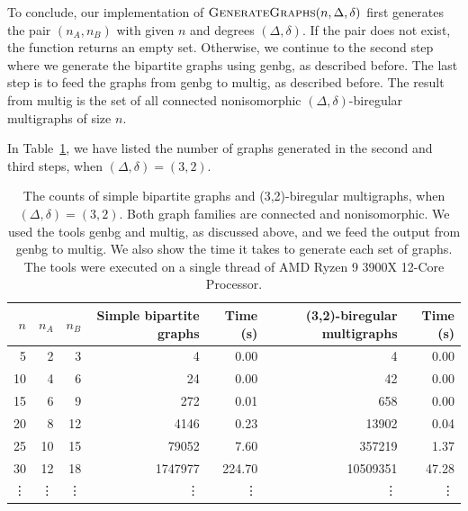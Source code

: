 To conclude, our implementation of $\textsc{GenerateGraphs}(n, \Delta, \delta)$ first generates the pair $(n_A, n_B)$ with given $n$ and degrees $(\Delta, \delta)$.
If the pair does not exist, the function returns an empty set.
Otherwise, we continue to the second step where we generate the bipartite graphs using genbg, as described before.
The last step is to feed the graphs from genbg to multig, as described before.
The result from multig is the set of all connected nonisomorphic $(\Delta, \delta)$-biregular multigraphs of size $n$.

In Table~\ref{tbl:graph_count_nonisomorphicasdasd}, we have listed the number of graphs generated in the second and third steps, when $(\Delta, \delta)=(3,2)$.


\begin{table}[H]
  \centering
  \begin{adjustbox}{width={\textwidth},keepaspectratio}%
  \begin{tabular}{r|rr|rr|rr}
    \toprule
    $n$& $n_A$ & $n_B$ & Simple bipartite graphs & Time (s) & (3,2)-biregular multigraphs  & Time (s)\\
    \midrule
    5   & 2 & 3   & 4  & 0.00    & 4     & 0.00\\
    10  & 4 & 6   & 24  & 0.00   & 42    & 0.00\\
    15  & 6 & 9   & 272  & 0.01  & 658   & 0.00\\
    20  & 8 & 12  & 4146 & 0.23  & 13902 & 0.04\\
    25  & 10 & 15 & 79052 & 7.60 & 357219& 1.37\\
    30  & 12 & 18 & 1747977 & 224.70 & 10509351& 47.28\\
    \vdots & \vdots &\vdots&\vdots&\vdots&\vdots&\vdots\\
    \bottomrule
  \end{tabular}
  \end{adjustbox}
  \caption{%
    The counts of simple bipartite graphs and (3,2)-biregular multigraphs, when $(\Delta, \delta) = (3, 2)$.
    Both graph families are connected and nonisomorphic.
    We used the tools genbg and multig, as discussed above, and we feed the output from genbg to multig.
    We also show the time it takes to generate each set of graphs.
    The tools were executed on a single thread of AMD Ryzen 9 3900X 12-Core Processor.
  }
  \label{tbl:graph_count_nonisomorphicasdasd}
\end{table}

